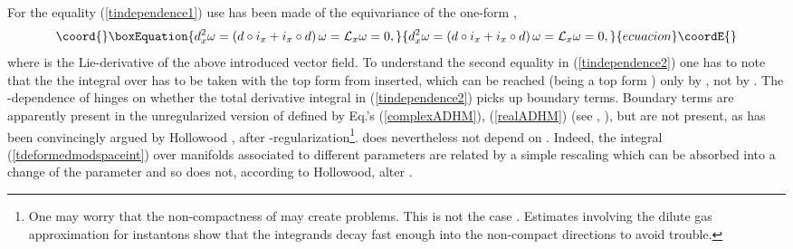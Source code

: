 \documentclass[a4paper,12pt]{article}
\begin{document}
For the equality (\ref{tindependence1}) use has been made of the equivariance of the one-form \myHighlight{$\omega$}\coordHE{},
\begin{equation}\coord{}\boxEquation{
d_x^2 \omega=\left(d \circ i_x+i_x \circ d\right)\omega={\cal L}_x
\omega=0,
}{
d_x^2 \omega=\left(d \circ i_x+i_x \circ d\right)\omega={\cal L}_x
\omega=0,
}{ecuacion}\coordE{}\end{equation}
where \coordHE{} is the Lie-derivative of the above introduced
\coordHE{} vector field. To understand the second equality in
(\ref{tindependence2}) one has to note that the the integral over
\coordHE{} has to be taken with the top form from \coordHE{} inserted, which can be reached (being
a top form ) only by \coordHE{}, not by \coordHE{}. The \coordHE{}-dependence of
\coordHE{} hinges on whether the total derivative integral in
(\ref{tindependence2}) picks up boundary terms. Boundary terms are
apparently present in the unregularized version of \coordHE{}
defined by Eq.'s (\ref{complexADHM}), (\ref{realADHM}) (see
\cite{FPS1}, \cite{FPS2}), but are not present, as has been
convincingly argued by Hollowood \cite{H}, after
\myHighlight{$\zeta$}\coordHE{}-regularization\footnote{One may worry that the
non-compactness of \coordHE{} may create problems. This is not
the case . Estimates involving the dilute gas approximation for
instantons show that the integrands decay fast enough into the
non-compact directions to avoid trouble.}. \coordHE{} does
nevertheless not depend on \myHighlight{$\zeta$}\coordHE{}. Indeed, the integral
(\ref{tdeformedmodspaceint}) over manifolds \coordHE{}
associated to different parameters \myHighlight{$\zeta$}\coordHE{} are related by a simple
rescaling which can be absorbed into a change of the parameter \coordHE{}
and so does not, according to Hollowood, alter \coordHE{}.
\end{document}
